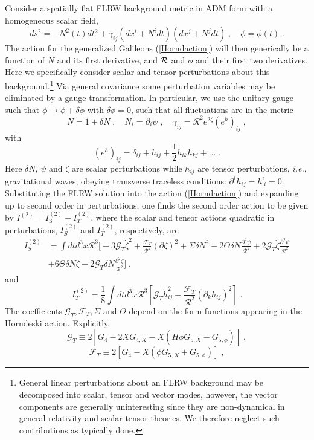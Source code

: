 \documentclass[amsmath,amssymb,11pt]{article}
\newcommand{\beq}{\begin{equation}}
\newcommand{\eeq}{\end{equation}}
\begin{document}
Consider a spatially flat FLRW background metric in ADM form with a homogeneous scalar field,
\beq ds^{2}=-N^{2}(t)dt^{2}+\gamma_{ij}(dx^{i}+N^{i}dt)(dx^{j}+N^{j}dt)\;,\quad \phi=\phi(t)\;.\eeq
The action for the generalized Galileons (\ref{Horndaction}) will then generically be a function of $N$ and its first derivative, and $\mathcal{R}$ and $\phi$ and their first two derivatives. Here we specifically consider scalar and tensor perturbations about this background.\footnote{General linear perturbations about an FLRW background may be decomposed into scalar, tensor and vector modes, however, the vector components are generally uninteresting since they are non-dynamical in general relativity and scalar-tensor theories. We therefore neglect such contributions as typically done.} Via general covariance some perturbation variables may be eliminated by a gauge transformation. In particular, we use the unitary gauge such that $\phi\to\phi+\delta\phi$ with $\delta\phi=0$, such that all fluctuations are in the metric 
\beq N=1+\delta N\;,\quad N_{i}=\partial_{i}\psi\;,\quad \gamma_{ij}=\mathcal{R}^{2}e^{2\zeta}(e^{h})_{ij}\;,\eeq
with
\beq (e^{h})_{ij}=\delta_{ij}+h_{ij}+\frac{1}{2}h_{ik}h_{kj}+...\;.\eeq
Here $\delta N$, $\psi$ and $\zeta$ are scalar perturbations while $h_{ij}$ are tensor perturbations, \emph{i.e.}, gravitational waves, obeying transverse traceless conditions: $\partial^{i}h_{ij}=h^{i}_{\;i}=0$. Substituting the FLRW solution into the action (\ref{Horndaction}) and expanding up to second order in perturbations, one finds the second order action to be given by $ I^{(2)}=I^{(2)}_{\text{S}}+I^{(2)}_{T}$, where the scalar and tensor actions quadratic in perturbations, $I_{S}^{(2)}$ and $I_{T}^{(2)}$, respectively, are \cite{Kobayashi:2011nu,Kobayashi:2019hrl}
\beq 
\begin{split}
I^{(2)}_{S}&=\int dt d^{3}x\mathcal{R}^{3}\biggr[-3\mathcal{G}_{T}\dot{\zeta}^{2}+\frac{\mathcal{F}_{T}}{\mathcal{R}^{2}}(\partial\zeta)^{2}+\Sigma\delta N^{2}-2\Theta\delta N\frac{\partial^{2}\psi}{\mathcal{R}^{2}}+2\mathcal{G}_{T}\dot{\zeta}\frac{\partial^{2}\psi}{\mathcal{R}^{2}}\\
&+6\Theta\delta N\dot{\zeta}-2\mathcal{G}_{T}\delta N\frac{\partial^{2}\zeta}{\mathcal{R}^{2}}\biggr]\;,
\end{split}
\eeq
and
\beq I^{(2)}_{T}=\frac{1}{8}\int dtd^{3}x\mathcal{R}^{3}\left[\mathcal{G}_{T}\dot{h}_{ij}^{2}-\frac{\mathcal{F}_{T}}{\mathcal{R}^{2}}(\partial_{k}h_{ij})^{2}\right]\;.\eeq
The coefficients $\mathcal{G}_{T},\mathcal{F}_{T},\Sigma$ and $\Theta$ depend on the form functions appearing in the Horndeski action. Explicitly, 
\beq \mathcal{G}_{T}\equiv2\left[G_{4}-2XG_{4,X}-X(H\dot{\phi}G_{5,X}-G_{5,\phi})\right]\;,\label{eq:GTgen}\eeq
\beq \mathcal{F}_{T}\equiv2\left[G_{4}-X\left(\ddot{\phi}G_{5,X}+G_{5,\phi}\right)\right]\;,\label{eq:FTgen}\eeq
\end{document}
